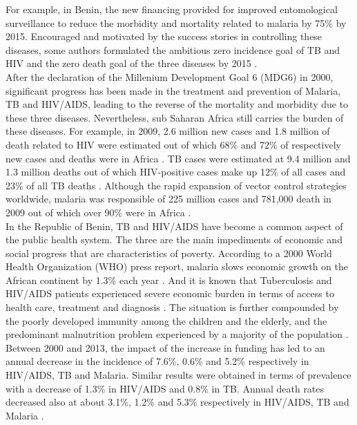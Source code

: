 For example, in Benin, the new financing provided for improved entomological surveillance to reduce the morbidity and mortality related to malaria by 75\% by 2015. 
Encouraged and motivated by the success stories in controlling these diseases, some authors formulated the ambitious zero incidence goal of TB and HIV and the zero death goal of the three diseases by 2015 \cite{joint_united_nations_programme_on_hiv/aids_getting_2010}. \\
After the declaration of the Millenium Development Goal 6 (MDG6) in 2000, significant progress has been made in the treatment and prevention of Malaria, TB and HIV/AIDS, leading to the reverse of the mortality and morbidity due to these three diseases. Nevertheless, sub Saharan Africa still carries the burden of these diseases. For example, in 2009, 2.6 million new cases and 1.8 million of death related to HIV were estimated out of which 68\% and 72\% of respectively new cases and deaths were in Africa \cite{joint_united_nations_programme_on_hiv/aids_global_2010}. TB cases were estimated at 9.4 million and 1.3 million deaths out of which HIV-positive cases make up 12\% of all cases and 23\% of all TB deaths \cite{world_health_organization_global_2010}. Although the rapid expansion of vector control strategies worldwide, malaria was responsible of 225 million cases and 781,000 death in 2009 out of which over 90\% were in Africa \cite{world_health_organization_world_2012}. \\
In the Republic of Benin, TB and HIV/AIDS have become a common aspect of the public health system. The three are the main impediments of economic and social progress that are characteristics of poverty. According to a 2000 World Health Organization (WHO) press report, malaria slows economic growth on the African continent by 1.3\% each year \cite{world_health_organization_economic_2000}. And it is known that Tuberculosis and HIV/AIDS patients experienced severe economic burden in terms of access to health care, treatment and diagnosis \cite{richter_economic_2014}. The situation is further compounded by the poorly developed immunity among the children and the elderly, and the predominant malnutrition problem experienced by a majority of the population \cite{jamison_disease_2006}. Between 2000 and 2013, the impact of the increase in funding has led to an annual decrease in the incidence of 7.6\%, 0.6\% and 5.2\% respectively in HIV/AIDS, TB and Malaria. Similar results were obtained in terms of prevalence with a decrease of 1.3\% in HIV/AIDS and 0.8\% in TB. Annual death rates decreased also at about 3.1\%, 1.2\% and 5.3\% respectively in HIV/AIDS, TB and Malaria \cite{world_health_organization_world_2012,joint_united_nations_programme_on_hiv/aids_global_2010,world_health_organization_global_2010}.\\
